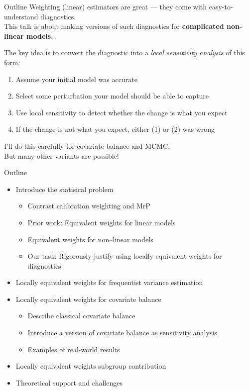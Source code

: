 \begin{frame}{Outline}
%
Weighting (linear) estimators are great --- they come with easy-to-understand diagnostics.\\[1em]

This talk is about making versions of such diagnostics for \textbf{complicated
non-linear models}.\\[2em]

\pause

The key idea is to convert the diagnostic into a \emph{local sensitivity analysis} of this form:

%
\begin{enumerate}
\item Assume your initial model was accurate
\item Select some perturbation your model should be able to capture
\item Use local sensitivity to detect whether the change is what you expect
\item If the change is not what you expect, either (1) or (2) was wrong
\end{enumerate}
%
\pause
\vspace{2em}
I'll do this carefully for covariate balance and MCMC.\\[1em]
But many other variants are possible!
\end{frame}



\begin{frame}{Outline}
%
%
\begin{itemize}
    \item Introduce the statisical problem
    \begin{itemize}
        \item Contrast calibration weighting and MrP
        \item Prior work: Equivalent weights for linear models
        \item Equivalent weights for non--linear models
        \item Our task: Rigorously justify using locally equivalent weights for diagnostics
    \end{itemize} \pause
    \item Locally equivalent weights for frequentist variance estimation \pause
    \item Locally equivalent weights for covariate balance
    \begin{itemize}
        \item Describe classical covariate balance
        \item Introduce a version of covariate balance as sensitivity analysis 
        \item Examples of real-world results
    \end{itemize} \pause
    \item Locally equivalent weights subgroup contribution
    \item Theoretical support and challenges
\end{itemize}
%
\end{frame}

